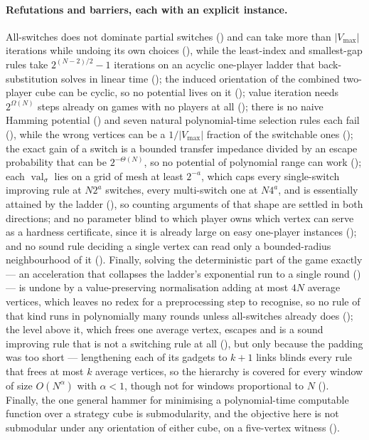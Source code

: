 \documentclass[11pt]{article}
\theoremstyle{plain}
\theoremstyle{definition}
\DeclareMathOperator{\val}{val}
\newcommand{\Vmax}{V_{\max}}
\begin{document}
\paragraph{Refutations and barriers, each with an explicit instance.}
All-switches does not dominate partial switches
() and can take more than $|\Vmax|$
iterations while undoing its own choices
(), while the least-index and
smallest-gap rules take $2^{(N-2)/2}-1$ iterations on an acyclic
one-player ladder that back-substitution solves in linear time
(); the induced orientation of the
combined two-player cube can be cyclic, so no potential lives on it
(); value iteration needs $2^{\Omega(N)}$ steps
already on games with no players at all (); there is
no naive Hamming potential () and seven natural
polynomial-time selection rules each fail (), while
the wrong vertices can be a $1/|\Vmax|$ fraction of the switchable ones
(); the exact gain of a switch is a bounded transfer
impedance divided by an escape probability that can be $2^{-\Theta(N)}$,
so no potential of polynomial range can work ();
each $\val_\sigma$ lies on a grid of mesh at least $2^{-a}$, which caps every single-switch
improving rule at $N2^{a}$ switches, every multi-switch one at $N4^{a}$,
and is essentially attained by the ladder
(), so counting arguments of that shape are
settled in both directions; and
no parameter blind to which player owns which vertex can serve as a
hardness certificate, since it is already large on easy one-player
instances (); and no sound rule deciding a single
vertex can read only a bounded-radius neighbourhood of it
(). Finally, solving the deterministic part of the
game exactly --- an acceleration that collapses the ladder's exponential
run to a single round () --- is undone by a
value-preserving normalisation adding at most $4N$ average vertices,
which leaves no redex for a preprocessing step to recognise, so no rule
of that kind runs in polynomially many rounds unless all-switches already
does (); the level above it, which frees one
average vertex, escapes and is a sound improving rule that is not a
switching rule at all (), but only because the
padding was too short --- lengthening each of its gadgets to $k+1$ links
blinds every rule that frees at most $k$ average vertices, so the
hierarchy is covered for every window of size $O(N^{\alpha})$ with
$\alpha<1$, though not for windows proportional to $N$
(). Finally, the one general
hammer for minimising a polynomial-time computable function over a strategy
cube is submodularity, and the objective here is not submodular under any
orientation of either cube, on a five-vertex witness
().
\end{document}
